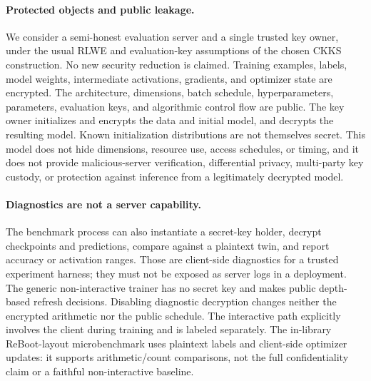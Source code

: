 \paragraph{Protected objects and public leakage.}
We consider a semi-honest evaluation server and a single trusted key owner, under the usual RLWE and evaluation-key assumptions of the chosen CKKS construction. No new security reduction is claimed. Training examples, labels, model weights, intermediate activations, gradients, and optimizer state are encrypted. The architecture, dimensions, batch schedule, hyperparameters, parameters, evaluation keys, and algorithmic control flow are public. The key owner initializes and encrypts the data and initial model, and decrypts the resulting model. Known initialization distributions are not themselves secret. This model does not hide dimensions, resource use, access schedules, or timing, and it does not provide malicious-server verification, differential privacy, multi-party key custody, or protection against inference from a legitimately decrypted model.

\paragraph{Diagnostics are not a server capability.}
The benchmark process can also instantiate a secret-key holder, decrypt checkpoints and predictions, compare against a plaintext twin, and report accuracy or activation ranges. Those are client-side diagnostics for a trusted experiment harness; they must not be exposed as server logs in a deployment. The generic non-interactive trainer has no secret key and makes public depth-based refresh decisions. Disabling diagnostic decryption changes neither the encrypted arithmetic nor the public schedule. The interactive path explicitly involves the client during training and is labeled separately. The in-library ReBoot-layout microbenchmark uses plaintext labels and client-side optimizer updates: it supports arithmetic/count comparisons, not the full confidentiality claim or a faithful non-interactive baseline.
